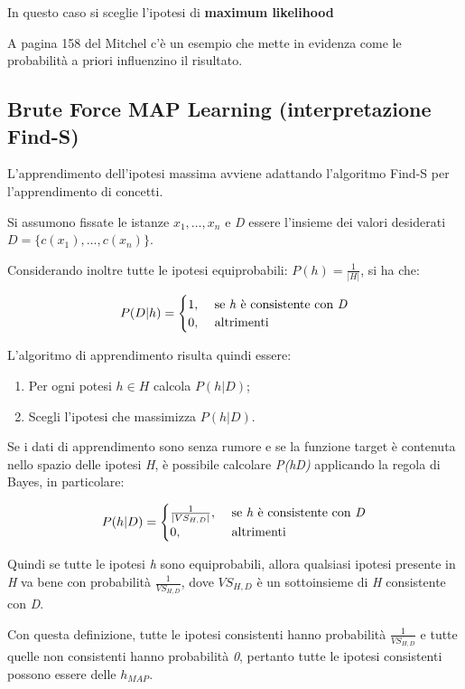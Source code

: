 In questo caso si sceglie l'ipotesi di \textbf{maximum likelihood}

A pagina 158 del Mitchel c'è un esempio che mette in evidenza come le
probabilità a priori influenzino il risultato.

\subsection{Brute Force MAP Learning (interpretazione Find-S)}\label{brute-force-map-learning-interpretazione-find-s}

L'apprendimento dell'ipotesi massima avviene adattando l'algoritmo Find-S per l'apprendimento di concetti.

Si assumono fissate le istanze $x_1, \ldots, x_n$ e \textit{D} essere l'insieme dei valori desiderati $D = \{ c(x_1), \ldots, c(x_n)\}$.

Considerando inoltre tutte le ipotesi equiprobabili: $P(h) = \frac{1}{|H|}$, si ha che:

$$
P(D|h) = 
	\begin{cases}
		1,& \text{ se \textit{h} è consistente con \textit{D}} \\
		0,& \text{ altrimenti }
	\end{cases}
$$

L'algoritmo di apprendimento risulta quindi essere:

\begin{enumerate}
\item Per ogni potesi $h \in H$ calcola $P(h|D)$;
\item Scegli l'ipotesi che massimizza $P(h|D)$.
\end{enumerate}

Se i dati di apprendimento sono senza rumore e se la funzione target è contenuta nello spazio delle ipotesi \textit{H}, è possibile calcolare \emph{P(h\textbar{}D)} applicando la regola di Bayes, in particolare:

$$
P(h|D) = 
	\begin{cases}
		\frac{1}{|VS_{H,D}|},& \text{ se \textit{h} è consistente con \textit{D}} \\
		0,& \text{ altrimenti }
	\end{cases}
$$

Quindi se tutte le ipotesi \emph{h} sono equiprobabili, allora qualsiasi
ipotesi presente in \emph{H} va bene con probabilità $\frac{1}{VS_{H,D}}$, dove $VS_{H,D}$ è un sottoinsieme di \textit{H} consistente con \textit{D}.

Con questa definizione, tutte le ipotesi consistenti hanno probabilità $\frac{1}{VS_{H,D}}$ e tutte quelle non consistenti hanno probabilità \textit{0}, pertanto tutte le ipotesi consistenti possono essere delle $h_{MAP}$.

